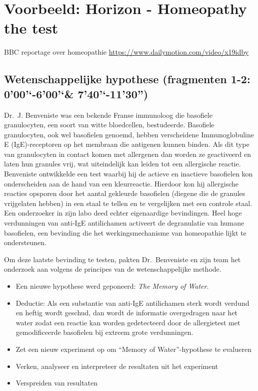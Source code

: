 \documentclass[12pt,dutch,coursenotes]{book}
\providecommand{\tightlist}{%
  \setlength{\itemsep}{0pt}\setlength{\parskip}{0pt}}
\theoremstyle{definition}
\theoremstyle{definition}
\theoremstyle{definition}
\theoremstyle{remark}
\begin{document}
\section{Voorbeeld: Horizon - Homeopathy the
test}\label{voorbeeld-horizon---homeopathy-the-test}

BBC reportage over homeopathie
\url{https://www.dailymotion.com/video/x19idby}

\subsection{\texorpdfstring{Wetenschappelijke hypothese (fragmenten 1-2:
0'00'`-6'00'`\&
7'40'`-11'30'')}{Wetenschappelijke hypothese (fragmenten 1-2: 0'00'-6'00\& 7'40-11'30')}}\label{wetenschappelijke-hypothese-fragmenten-1-2-000-600-740-1130}

Dr.~J. Benveniste was een bekende Franse immunoloog die basofiele
granulocyten, een soort van witte bloedcellen, bestudeerde. Basofiele
granulocyten, ook wel basofielen genoemd, hebben verscheidene
Immunoglobuline E (IgE)-receptoren op het membraan die antigenen kunnen
binden. Als dit type van granulocyten in contact komen met allergenen
dan worden ze geactiveerd en laten hun granules vrij, wat uiteindelijk
kan leiden tot een allergische reactie. Benveniste ontwikkelde een test
waarbij hij de actieve en inactieve basofielen kon onderscheiden aan de
hand van een kleurreactie. Hierdoor kon hij allergische reacties
opsporen door het aantal gekleurde basofielen (diegene die de granules
vrijgelaten hebben) in een staal te tellen en te vergelijken met een
controle staal. Een onderzoeker in zijn labo deed echter eigenaardige
bevindingen. Heel hoge verdunningen van anti-IgE antilichamen activeert
de degranulatie van humane basofielen, een bevinding die het
werkingsmechanisme van homeopathie lijkt te ondersteunen.

Om deze laatste bevinding te testen, pakten Dr.~Benveniste en zijn team
het onderzoek aan volgens de principes van de wetenschappelijke methode.

\begin{itemize}
\tightlist
\item
  Een nieuwe hypothese werd geponeerd: \emph{The Memory of Water}.
\item
  Deductie: Als een substantie van anti-IgE antilichamen sterk wordt
  verdund en heftig wordt geschud, dan wordt de informatie overgedragen
  naar het water zodat een reactie kan worden gedetecteerd door de
  allergietest met gemodificeerde basofielen bij extreem grote
  verdunningen.
\item
  Zet een nieuw experiment op om ``Memory of Water''-hypothese te
  evalueren
\item
  Verken, analyseer en interpreteer de resultaten uit het experiment
\item
  Verspreiden van resultaten
\end{itemize}
\end{document}
